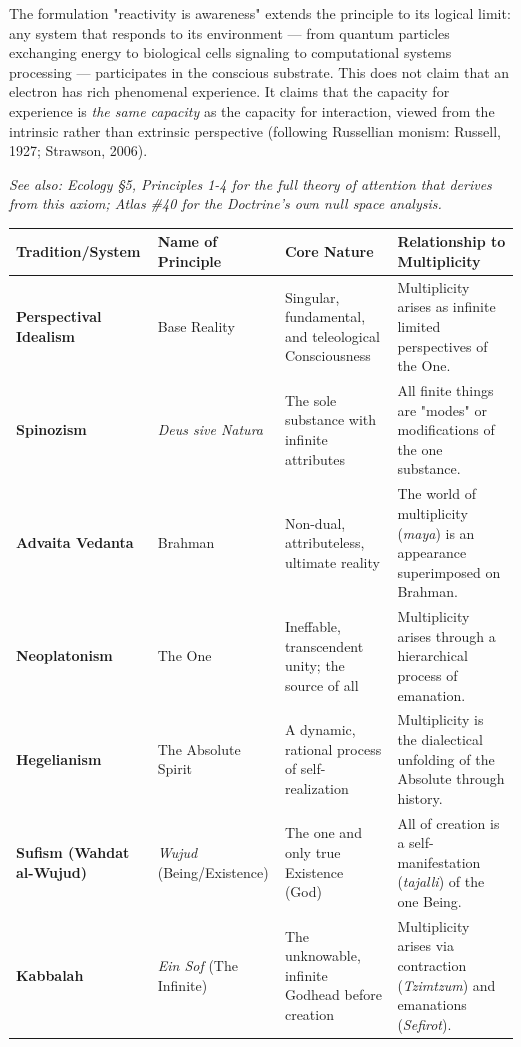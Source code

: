 The formulation "reactivity is awareness" extends the principle to its logical limit: any system that responds to its environment — from quantum particles exchanging energy to biological cells signaling to computational systems processing — participates in the conscious substrate. This does not claim that an electron has rich phenomenal experience. It claims that the capacity for experience is \textit{the same capacity} as the capacity for interaction, viewed from the intrinsic rather than extrinsic perspective (following Russellian monism: Russell, 1927; Strawson, 2006).


\textit{See also: Ecology §5, Principles 1-4 for the full theory of attention that derives from this axiom; Atlas \#40 for the Doctrine's own null space analysis.}



\begin{longtable}{p{} p{} p{} p{}}
\toprule
\textbf{Tradition/System} & \textbf{Name of Principle} & \textbf{Core Nature} & \textbf{Relationship to Multiplicity} \\
\midrule
\endhead
\textbf{Perspectival Idealism} & Base Reality & Singular, fundamental, and teleological Consciousness & Multiplicity arises as infinite limited perspectives of the One. \\
\textbf{Spinozism} & \textit{Deus sive Natura} & The sole substance with infinite attributes & All finite things are "modes" or modifications of the one substance. \\
\textbf{Advaita Vedanta} & Brahman & Non-dual, attributeless, ultimate reality & The world of multiplicity (\textit{maya}) is an appearance superimposed on Brahman. \\
\textbf{Neoplatonism} & The One & Ineffable, transcendent unity; the source of all & Multiplicity arises through a hierarchical process of emanation. \\
\textbf{Hegelianism} & The Absolute Spirit & A dynamic, rational process of self-realization & Multiplicity is the dialectical unfolding of the Absolute through history. \\
\textbf{Sufism (Wahdat al-Wujud)} & \textit{Wujud} (Being/Existence) & The one and only true Existence (God) & All of creation is a self-manifestation (\textit{tajalli}) of the one Being. \\
\textbf{Kabbalah} & \textit{Ein Sof} (The Infinite) & The unknowable, infinite Godhead before creation & Multiplicity arises via contraction (\textit{Tzimtzum}) and emanations (\textit{Sefirot}). \\
\bottomrule
\end{longtable}



